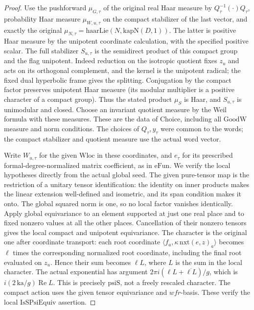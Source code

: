 \begin{proof}
Use the pushforward \(\mu_{G,\tau}\) of the original real
Haar measure by \(Q_\tau^{-1}(\cdot)Q_\tau\), probability Haar
measure \(\mu_{W,u,\tau}\) on the compact stabilizer of the
last vector, and exactly the original
\(\mu_{N,\tau}=\mathrm{haarLie}(N,\mathrm{kapN}(D,1))\).
The latter is positive Haar measure by the unipotent
coordinate calculation, with the specified positive scalar.
The full stabilizer \(S_{u,\tau}\) is the semidirect
product of this compact group and the flag unipotent.
Indeed reduction on the isotropic quotient fixes \(z_u\)
and acts on its orthogonal complement, and the kernel is
the unipotent radical; the fixed dual hyperbolic frame
gives the splitting. Conjugation by the compact factor
preserves unipotent Haar measure (its modular multiplier
is a positive character of a compact group).
Thus the stated product \(\mu_S\) is Haar, and \(S_{u,\tau}\)
is unimodular and closed. Choose an invariant quotient
measure by the Weil formula with these measures.
These are the data of \(\mathrm{Choice}\), including all
\(\mathrm{GoodW}\) measure and norm conditions.
The choices of \(Q_\tau,y_\tau\) were common to the words;
the compact stabilizer and quotient measure use the actual
word vector.

Write \(W_{u,\tau}\) for the given \(\mathrm{Wloc}\) in
these coordinates, and \(e_\tau\) for its prescribed
formal-degree-normalized matrix coefficient, as in
\(\mathrm{eFun}\). We verify the local hypotheses directly
from the actual global seed. The given pure-tensor map
is the restriction of a unitary tensor identification:
the identity on inner products makes the linear extension
well-defined and isometric, and its span condition makes
it onto. The global squared norm is one, so no local
factor vanishes identically. Apply global equivariance to
an element supported at just one real place and to fixed
nonzero values at all the other places. Cancellation of
their nonzero tensors gives the local compact and
unipotent equivariance. The character is the original
one after coordinate transport: each root coordinate
\(\langle f_a,\kappa\,\mathrm{nxt}(e,z)_a\rangle\)
becomes \(\ell\) times the corresponding normalized root
coordinate, including the final root evaluated on \(z_u\).
Hence their sum becomes \(\ell L\), where \(L\) is the
sum in the local character. The actual exponential has
argument \(2\pi i(\ell L+\overline{\ell L})/g\),
which is \(i(2\,\mathrm{ka}/g)\operatorname{Re}L\).
This is precisely \(\mathrm{psiS}\), not a freely
rescaled character. The compact action uses the given
tensor equivariance and \(wfr\)-basis. These verify the
local \(\mathrm{IsSPsiEquiv}\) assertion.


\end{proof}
